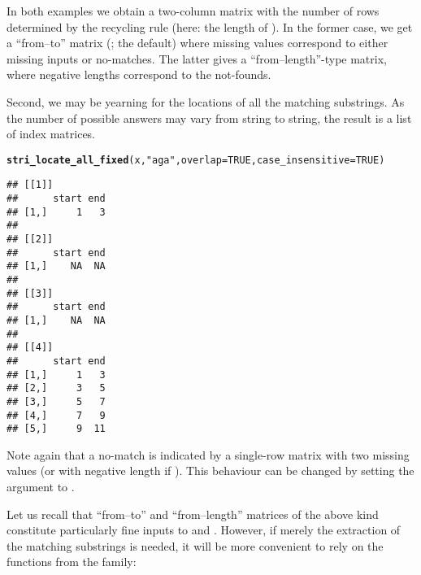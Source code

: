 \documentclass[nojss]{jss}\usepackage[]{graphicx}\usepackage[]{xcolor}
\makeatletter
\newcommand{\hlnum}[1]{\textcolor[rgb]{0.686,0.059,0.569}{#1}}%
\newcommand{\hlstr}[1]{\textcolor[rgb]{0.192,0.494,0.8}{#1}}%
\newcommand{\hlstd}[1]{\textcolor[rgb]{0.345,0.345,0.345}{#1}}%
\newcommand{\hlkwc}[1]{\textcolor[rgb]{0.333,0.667,0.333}{#1}}%
\newcommand{\hlkwd}[1]{\textcolor[rgb]{0.737,0.353,0.396}{\textbf{#1}}}%
\newenvironment{kframe}{%
 \def\at@end@of@kframe{}%
 \ifinner\ifhmode%
  \def\at@end@of@kframe{\end{minipage}}%
  \begin{minipage}{\columnwidth}%
 \fi\fi%
 \def\FrameCommand##1{\hskip\@totalleftmargin \hskip-\fboxsep
 \colorbox{shadecolor}{##1}\hskip-\fboxsep
     \hskip-\linewidth \hskip-\@totalleftmargin \hskip\columnwidth}%
 \MakeFramed {\advance\hsize-\width
   \@totalleftmargin\z@ \linewidth\hsize
   \@setminipage}}%
 {\par\unskip\endMakeFramed%
 \at@end@of@kframe}
\newenvironment{knitrout}{}{} %
\makeatother
\begin{document}
\noindent
In both examples we obtain a two-column matrix
with the number of rows determined by the recycling rule (here:
the length of ).
In the former case, we get a ``from--to'' matrix (;
the default) where missing values correspond to either missing inputs or
no-matches. The latter gives a ``from--length''-type matrix,
where negative lengths correspond to the not-founds.

Second, we may be yearning for the locations of all the matching
substrings. As the number of possible answers may vary from string to string,
the result is a list of index matrices.

\begin{knitrout}
\color{fgcolor}\begin{kframe}
\begin{alltt}
\hlkwd{stri_locate_all_fixed}\hlstd{(x,} \hlstr{"aga"}\hlstd{,} \hlkwc{overlap}\hlstd{=}\hlnum{TRUE}\hlstd{,} \hlkwc{case_insensitive}\hlstd{=}\hlnum{TRUE}\hlstd{)}
\end{alltt}
\begin{verbatim}
## [[1]]
##      start end
## [1,]     1   3
## 
## [[2]]
##      start end
## [1,]    NA  NA
## 
## [[3]]
##      start end
## [1,]    NA  NA
## 
## [[4]]
##      start end
## [1,]     1   3
## [2,]     3   5
## [3,]     5   7
## [4,]     7   9
## [5,]     9  11
\end{verbatim}
\end{kframe}
\end{knitrout}

\noindent
Note again that a no-match is indicated by a single-row matrix
with two missing values (or with negative length if ).
This behaviour can be changed by setting the 
argument to .


\medskip
Let us recall that ``from--to'' and ``from--length''
matrices of the above kind constitute particularly
fine inputs to  and .
However, if merely the extraction of the matching substrings is needed,
it will be more convenient to rely on the functions from the
 family:
\end{document}
